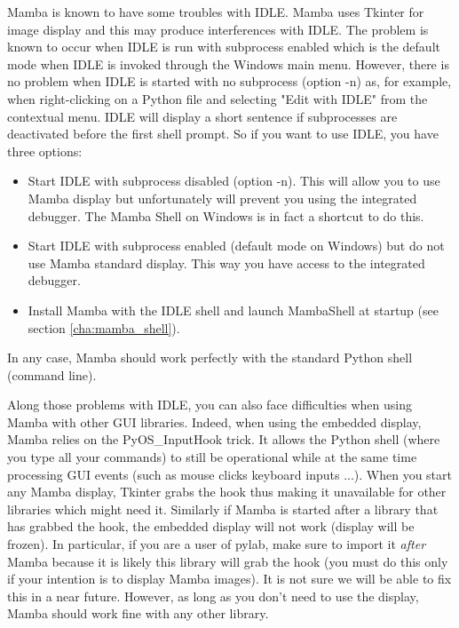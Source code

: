 \documentclass[a4paper,10pt,oneside]{article}
\begin{document}
Mamba is known to have some troubles with IDLE. Mamba uses
Tkinter for image display and this may produce interferences with IDLE. The
problem is known to occur when IDLE is run with subprocess enabled which is the
default mode when IDLE is invoked through the Windows main menu. However, there 
is no problem when IDLE is started with no subprocess (option -n) as, for 
example, when right-clicking on a Python file and selecting "Edit with IDLE" from
the contextual menu. IDLE will display a short sentence if subprocesses are
deactivated before the first shell prompt. So if you want to use IDLE, you have
three options:

\begin{itemize}
\item Start IDLE with subprocess disabled (option -n). This will allow you to 
use Mamba display but unfortunately will prevent you using the integrated
debugger. The Mamba Shell on Windows is in fact a shortcut to do this.
\item Start IDLE with subprocess enabled (default mode on Windows) but do not
use Mamba standard display. This way you have access to the integrated debugger.
\item Install Mamba with the IDLE shell and launch MambaShell at startup (see
section \ref{cha:mamba_shell}).
\end{itemize}

In any case, Mamba should work perfectly with the standard Python shell 
(command line).

Along those problems with IDLE, you can also face difficulties when using
Mamba with other GUI libraries. Indeed, when using the embedded display,
Mamba relies on the PyOS\_InputHook trick. It allows the Python shell (where 
you type all your commands) to still be operational while at the same time
processing GUI events (such as mouse clicks keyboard inputs ...). When you
start any Mamba display, Tkinter grabs the hook thus making it unavailable
for other libraries which might need it. Similarly if Mamba is started
after a library that has grabbed the hook, the embedded display will not
work (display will be frozen). In particular, if you are a user of pylab,
make sure to import it \textit{after} Mamba because it is likely
this library will grab the hook (you must do this only if your intention is to
display Mamba images). It is not sure we will be able to fix this in a near
future. However, as long as you don't need to use the display, Mamba should 
work fine with any other library.

\pagebreak
\end{document}
